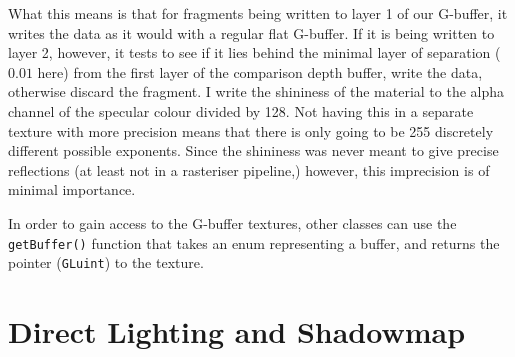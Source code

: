 What this means is that for fragments being written to layer 1 of our G-buffer, it writes the data as it would with a regular flat G-buffer. If it is being written to layer 2, however, it tests to see if it lies behind the minimal layer of separation ($0.01$ here) from the first layer of the comparison depth buffer, write the data, otherwise discard the fragment. I write the shininess of the material to the alpha channel of the specular colour divided by 128. Not having this in a separate texture with more precision means that there is only going to be 255 discretely different possible exponents. Since the shininess was never meant to give precise reflections (at least not in a rasteriser pipeline,) however, this imprecision is of minimal importance.

In order to gain access to the G-buffer textures, other classes can use the \verb=getBuffer()= function that takes an enum representing a buffer, and returns the pointer (\verb=GLuint=) to the texture.

\section{Direct Lighting and Shadowmap}

